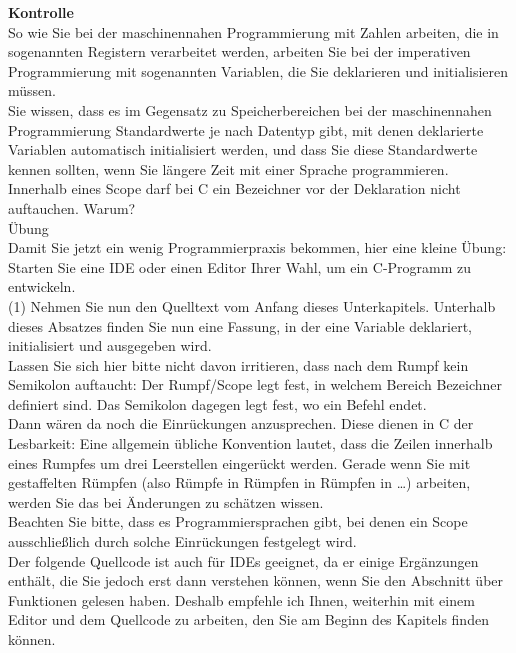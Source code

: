 \textbf{Kontrolle}\\

So wie Sie bei der maschinennahen Programmierung mit Zahlen arbeiten, die in sogenannten Registern verarbeitet werden, arbeiten Sie bei der imperativen Programmierung mit sogenannten Variablen, die Sie deklarieren und initialisieren müssen.\\

Sie wissen, dass es im Gegensatz zu Speicherbereichen bei der maschinennahen Programmierung Standardwerte je nach Datentyp gibt, mit denen deklarierte Variablen automatisch initialisiert werden, und dass Sie diese Standardwerte kennen sollten, wenn Sie längere Zeit mit einer Sprache programmieren.\\

Innerhalb eines Scope darf bei C ein Bezeichner vor der Deklaration nicht auftauchen. Warum?\\

Übung\\

Damit Sie jetzt ein wenig Programmierpraxis bekommen, hier eine kleine Übung:
Starten Sie eine IDE oder einen Editor Ihrer Wahl, um ein C-Programm zu entwickeln.\\

(1) Nehmen Sie nun den Quelltext vom Anfang dieses Unterkapitels. Unterhalb dieses Absatzes finden Sie nun eine Fassung, in der eine Variable deklariert, initialisiert und ausgegeben wird.\\

Lassen Sie sich hier bitte nicht davon irritieren, dass nach dem Rumpf kein Semikolon auftaucht: Der Rumpf/Scope legt fest, in welchem Bereich Bezeichner definiert sind. Das Semikolon dagegen legt fest, wo ein Befehl endet.\\

Dann wären da noch die Einrückungen anzusprechen. Diese dienen in C der Lesbarkeit: Eine allgemein übliche Konvention lautet, dass die Zeilen innerhalb eines Rumpfes um drei Leerstellen eingerückt werden. Gerade wenn Sie mit gestaffelten Rümpfen (also Rümpfe in Rümpfen in Rümpfen in …) arbeiten, werden Sie das bei Änderungen zu schätzen wissen.\\

Beachten Sie bitte, dass es Programmiersprachen gibt, bei denen ein Scope ausschließlich durch solche Einrückungen festgelegt wird.\\

Der folgende Quellcode ist auch für IDEs geeignet, da er einige Ergänzungen enthält, die Sie jedoch erst dann verstehen können, wenn Sie den Abschnitt über Funktionen gelesen haben. Deshalb empfehle ich Ihnen, weiterhin mit einem Editor und dem Quellcode zu arbeiten, den Sie am Beginn des Kapitels finden können. \\

